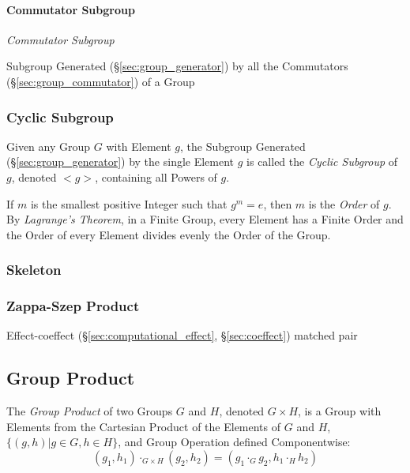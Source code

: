 \paragraph{Commutator Subgroup}\label{sec:commutator_subgroup}\hfill

\emph{Commutator Subgroup}

Subgroup Generated (\S\ref{sec:group_generator}) by all the
Commutators (\S\ref{sec:group_commutator}) of a Group



\subsubsection{Cyclic Subgroup}\label{sec:cyclic_subgroup}

Given any Group $G$ with Element $g$, the Subgroup Generated
(\S\ref{sec:group_generator}) by the single Element $g$ is called the
\emph{Cyclic Subgroup} of $g$, denoted $<g>$, containing all Powers of
$g$.

If $m$ is the smallest positive Integer such that $g^m = e$, then $m$
is the \emph{Order} of $g$. By \emph{Lagrange's Theorem}, in a Finite
Group, every Element has a Finite Order and the Order of every Element
divides evenly the Order of the Group.



\subsubsection{Skeleton}\label{sec:group_skeleton}

\subsubsection{Zappa-Szep Product}\label{sec:zappa_szep}

Effect-coeffect (\S\ref{sec:computational_effect},
\S\ref{sec:coeffect}) matched pair



\subsection{Group Product}\label{sec:group_product}

The \emph{Group Product} of two Groups $G$ and $H$, denoted $G \times
H$, is a Group with Elements from the Cartesian Product of the
Elements of $G$ and $H$, $\{(g,h) | g \in G, h \in H\}$, and Group
Operation defined Componentwise:
\[
    (g_1, h_1) \cdot_{G \times H} (g_2, h_2)
    = (g_1 \cdot_G g_2, h_1 \cdot_H h_2)
\]

